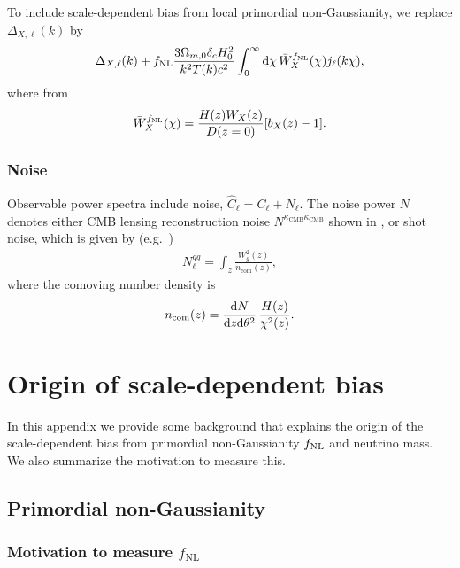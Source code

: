 \documentclass[prd,superscriptaddress,floatfix,notitlepage,nofootinbib,reprint]{revtex4-1} %
\begin{document}
To include scale-dependent bias from local primordial non-Gaussianity, we replace
$\Delta_{X,\ell}(k)$ by
\begin{align}
  \label{eq:45}
\Delta_{X,\ell}(k) 
+ 
{f_\mathrm{NL}}\frac{3\Omega_{m,0}\delta_cH_0^2}{k^2T(k)c^2}
\int_0^\infty\mathrm{d}\chi\,\bar W_{X}^{{f_\mathrm{NL}}}(\chi)j_\ell(k\chi),
\end{align}
where from 
\begin{align}
  \label{eq:46}
\bar W_{X}^{{f_\mathrm{NL}}}(\chi) = \frac{H(z)W_X(z)}{D(z=0)}[b_X(z)-1].
\end{align}


\subsubsection{Noise}
Observable power spectra include noise, $\hat C_\ell=C_\ell+N_\ell$.
The noise power $N$ denotes either CMB lensing reconstruction noise $N^{\kappa_\mathrm{CMB}\kappa_\mathrm{CMB}}$ shown in , or shot noise, which is given by (e.g.~\cite{FontRibera1308})
\begin{align}
  \label{eq:13}
  N^{gg}_\ell = \int_z \frac{W_g^2(z)}{n_\mathrm{com}(z)},
\end{align}
where the comoving number density is
\begin{align}
  \label{eq:15}
  n_\mathrm{com}(z) 
= \frac{\mathrm{d} N}{\mathrm{d} z\mathrm{d}\theta^2}\,
\frac{H(z)}{\chi^2(z)}.
\end{align}




\section{Origin of scale-dependent bias}

\label{app:FnlAndMnuBasicsAppdx}

In this appendix we provide some background that explains the origin of the scale-dependent bias from primordial non-Gaussianity ${f_\mathrm{NL}}$ and neutrino mass. We also summarize the motivation to measure this.



\subsection{Primordial non-Gaussianity}

\label{app:fnlBasicsAppdx}

\subsubsection{Motivation to measure $f_\mathrm{NL}$}
\end{document}
